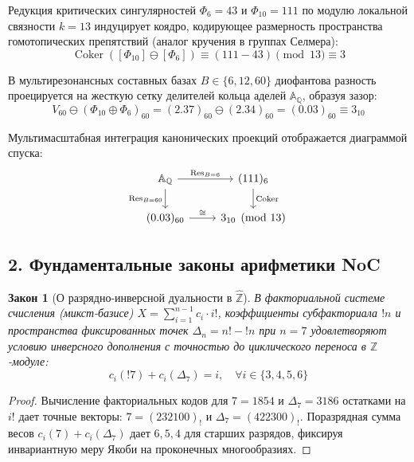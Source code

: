 \documentclass[10pt,twocolumn]{article}
\DeclareMathOperator{\Coker}{Coker}
\newtheorem{law}{Закон}
\begin{document}
Редукция критических сингулярностей $\Phi_6 = 43$ и $\Phi_{10} = 111$ по модулю локальной связности $k=13$ индуцирует коядро, кодирующее размерность пространства гомотопических препятствий (аналог кручения в группах Селмера):
\begin{equation}
\Coker\left([\Phi_{10}] \ominus [\Phi_{6}]\right) \equiv (111 - 43) \pmod{13} \equiv 3
\end{equation}

В мультирезонансных составных базах $B \in \{6, 12, 60\}$ диофантова разность проецируется на жесткую сетку делителей кольца аделей $\mathbb{A}_{\mathbb{Q}}$, образуя зазор:
\begin{equation}
V_{60} \ominus (\Phi_{10} \oplus \Phi_6)_{60} = (2.37)_{60} \ominus (2.34)_{60} = (0.03)_{60} \equiv 3_{10}
\end{equation}

Мультимасштабная интеграция канонических проекций отображается диаграммой спуска:
\[
\begin{tikzcd}
\mathbb{A}_{\mathbb{Q}} \arrow[r, "\text{Res}_{B=6}"] \arrow[d, "\text{Res}_{B=60}"'] & (111)_6 \arrow[d, "\Coker"] \\
(0.03)_{60} \arrow[r, "\cong"] & 3_{10} \pmod{13}
\end{tikzcd}
\]

\subsection*{2. Фундаментальные законы арифметики NoC}

\begin{law}[О разрядно-инверсной дуальности в $\hat{\mathbb{Z}}$]
В факториальной системе счисления (микст-базисе) $X = \sum_{i=1}^{n-1} c_i \cdot i!$, коэффициенты субфакториала $!n$ и пространства фиксированных точек $\Delta_n = n! - !n$ при $n=7$ удовлетворяют условию инверсного дополнения с точностью до циклического переноса в $\mathbb{Z}$-модуле:
\begin{equation}
c_i(!7) + c_i(\Delta_7) = i, \quad \forall i \in \{3, 4, 5, 6\}
\end{equation}
\end{law}

\begin{proof}
Вычисление факториальных кодов для $\!7 = 1854$ и $\Delta_7 = 3186$ остатками на $i!$ дает точные векторы: $\!7 = (232100)_{!}$ и $\Delta_7 = (422300)_{!}$. Поразрядная сумма весов $c_i(\!7) + c_i(\Delta_7)$ дает $6, 5, 4$ для старших разрядов, фиксируя инвариантную меру Якоби на проконечных многообразиях.
\end{proof}
\end{document}
